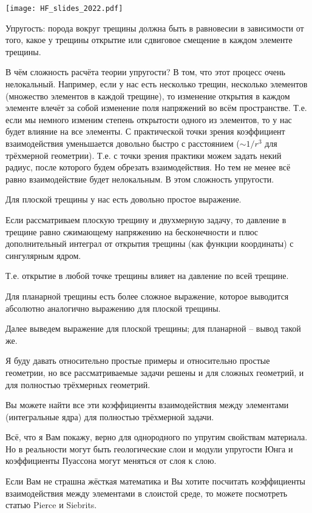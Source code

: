 \documentclass[main.tex]{subfiles}
\begin{document}
\texttt{[image: HF\_slides\_2022.pdf]}

Упругость: порода вокруг трещины должна быть в равновесии в зависимости от того, какое у трещины открытие или сдвиговое смещение в каждом элементе трещины.

В чём сложность расчёта теории упругости? В том, что этот процесс очень нелокальный.
Например, если у нас есть несколько трещин, несколько элементов (множество элементов в каждой трещине), то изменение открытия в каждом элементе влечёт за собой изменение поля напряжений во всём пространстве.
Т.е. если мы немного изменим степень открытости одного из элементов, то у нас будет влияние на все элементы.
С практической точки зрения коэффициент взаимодействия уменьшается довольно быстро с расстоянием ($\sim 1/r^3$ для трёхмерной геометрии).
Т.е. с точки зрения практики можем задать некий радиус, после которого будем обрезать взаимодействия.
Но тем не менее всё равно взаимодействие будет нелокальным.
В этом сложность упругости.


Для плоской трещины у нас есть довольно простое выражение.

Если рассматриваем плоскую трещину и двухмерную задачу, то давление в трещине равно сжимающему напряжению на бесконечности и плюс дополнительный интеграл от открытия трещины (как функции координаты) с сингулярным ядром.

Т.е. открытие в любой точке трещины влияет на давление по всей трещине.


Для планарной трещины есть более сложное выражение, которое выводится абсолютно аналогично выражению для плоской трещины.

Далее выведем выражение для плоской трещины; для планарной -- вывод такой же.


Я буду давать относительно простые примеры и относительно простые геометрии, но все рассматриваемые задачи решены и для сложных геометрий, и для полностью трёхмерных геометрий.

Вы можете найти все эти коэффициенты взаимодействия между элементами (интегральные ядра) для полностью трёхмерной задачи.

Всё, что я Вам покажу, верно для однородного по упругим свойствам материала.
Но в реальности могут быть геологические слои и модули упругости Юнга и коэффициенты Пуассона могут меняться от слоя к слою.

Если Вам не страшна жёсткая математика и Вы хотите посчитать коэффициенты взаимодействия между элементами в слоистой среде, то можете посмотреть статью Pierce и Siebrits.
\end{document}
